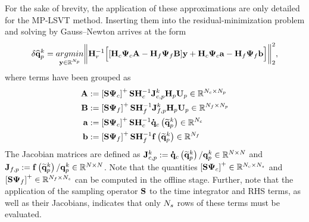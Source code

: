 For the sake of brevity, the application of these approximations are only detailed for the MP-LSVT method. Inserting them into the residual-minimization problem and solving by Gauss--Newton arrives at the form
%
\begin{equation}\label{eq:dualBasisGaussNewton}
		\delta \primVecCoef^{\newtonIdx} = \underset{\dummyVec \inROne{\numPrimModes}}{argmin} \bigg\Vert \resScaleInv \Big[ [\consScale \deimBasisCons \dummyMatOne - \rhsScale \deimBasisRhs \dummyMatTwo] \dummyVec
		+ \consScale \deimBasisCons \dummyVecOne - \rhsScale \deimBasisRhs \dummyVecTwo \Big] \bigg\Vert_2^2,
\end{equation}
%
where terms have been grouped as
%
\begin{align}
	\dummyMatOne &\defEq \deimRegressorConsTiny \sampMat \consScaleInv \gm^{\newtonIdx} \primScale \primTrial \inRTwo{\numConsModes}{\numPrimModes} \\
	\dummyMatTwo &\defEq \deimRegressorRhsTiny \sampMat \rhsScaleInv \jacobRhsPrim^{\newtonIdx} \primScale \primTrial \inRTwo{\numRHSModes}{\numPrimModes} \\
	\dummyVecOne &\defEq \deimRegressorConsTiny \sampMat \consScaleInv \consVecDt \left(\primVecRom^{\newtonIdx}\right) \inROne{\numConsModes} \\
	\dummyVecTwo &\defEq \deimRegressorRhsTiny \sampMat \rhsScaleInv \rhsFunc{\primVecRom^{\newtonIdx}} \inROne{\numRHSModes}
\end{align}
%
The Jacobian matrices are defined as $\mathbf{J}_{c,p}^{k} := \accentset{\mbox{\large\bfseries .}}{\mathbf{q}}_{c}\left(\mathbf{\widetilde{q}}_{p}^{k}\right) / \mathbf{q}_{p}^{k} \in \mathbb{R}^{N \times N}$ and $\mathbf{J}_{f,p} := \mathbf{f} \left(\mathbf{\widetilde{q}}_{p}^{k}\right) / \mathbf{q}_{p}^{k} \in \mathbb{R}^{N \times N}$. Note that the quantities $\deimRegressorConsTiny \inRTwo{\numConsModes}{\numSamps}$ and $\deimRegressorRhsTiny \inRTwo{\numRHSModes}{\numSamps}$ can be computed in the offline stage. Further, note that the application of the sampling operator $\mathbf{S}$ to the time integrator and RHS terms, as well as their Jacobians, indicates that only $N_s$ rows of these terms must be evaluated.

